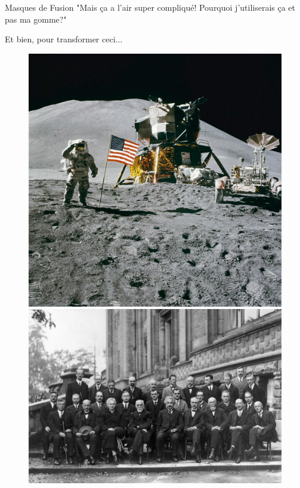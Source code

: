 \documentclass[10pt,svgnames,usenames,table]{beamer}
\begin{document}
	\begin{frame}{Masques de Fusion}
		"Mais ça a l'air super compliqué! Pourquoi j'utiliserais ça et pas ma gomme?"
	
		Et bien, pour transformer ceci...
	
		\begin{figure}[H]
			\centering
			\begin{minipage}{.5\textwidth}
				\centering
				\includegraphics[width=.9\textwidth]{Images/purge/Apollo_15_flag,_rover,_LM,_Irwin}
			\end{minipage}%
			\begin{minipage}{.5\textwidth}
				\centering
				\includegraphics[width=.9\textwidth]{Images/mask/Conference_Solvay_Original}
			\end{minipage}
		\end{figure}
			
	
	\end{frame}	
\end{document}
